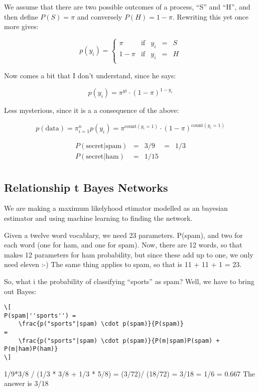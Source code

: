 \documentclass[a4, 12pt, english, USenglish]{scrreprt}
\begin{document}
We assume that there are two possible outcomes of a process, ``S'' and
``H'', and then define \(P(S) = \pi\) and conversely \(P(H) = 1 - \pi
\). Rewriting this yet once more gives:

\[
p(y_i) =
\left\{
\begin{array}{cclcl}
   \pi & \mbox{if} & y_i &=& S \\
1-\pi & \mbox{if} & y_i &=& H \\
\end{array}
\right.
\]


Now comes a bit that I don't understand, since he says:

\[
p(y_i) = \pi^{yi} \cdot (1-\pi)^{1 - y_i}
\]

Less mysterious, since it is a a consequence of the above:

\[
p(\mbox{data}) = \pi_{i=1}^n p(y_i) = \pi^{\mbox{count}(y_i=1)} \cdot
(1 - \pi)^{\mbox{count}(y_i=1)} 
\]



\[
\begin{array}{lclcl}
  P(\mbox{secret}| \mbox{spam})  &=& 3/9 &=& 1/3 \\
  P(\mbox{secret}|\mbox{ham})    &=& 1/15 && \\
\end{array}
\]


\subsection{Relationship t Bayes Networks}

We are making a maximum likelyhood etimator modelled as an bayesian
estimator and using machine learning to finding the network.

Given a twelve word vocablary, we need 23 parameters. P(spam), and two
for each word (one for ham, and one for spam). Now, there are 12
words, so that makes 12 parameters for ham probability, but since
these add up to one, we only need eleven :-)  The same thing applies
to spam, so that is 11 + 11 + 1 = 23.

So, what i the probability of classifying ``sports'' as spam?  Well,
we have to bring out Bayes:

\begin{verbatim}
\[
P(spam|''sports'') =
    \frac{p("sports"|spam) \cdot p(spam)}{P(spam)} 
= 
    \frac{p("sports"|spam) \cdot p(spam)}{P(m|spam)P(spam) + P(m|ham)P(ham)}
\]
\end{verbatim}

1/9*3/8  / (1/3 * 3/8   + 1/3 * 5/8) = (3/72)/ (18/72) = 3/18 = 1/6 = 0.667
The answer is 3/18
\end{document}

